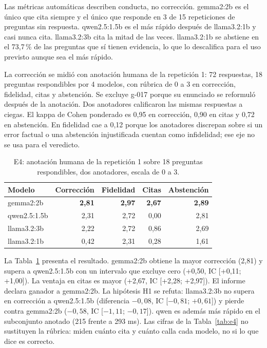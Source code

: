 \documentclass[11pt]{tg_usta}
\begin{document}
Las métricas automáticas describen conducta, no corrección. gemma2:2b es el único que cita siempre y el único que responde en 3 de 15 repeticiones de preguntas sin respuesta. qwen2.5:1.5b es el más rápido después de llama3.2:1b y casi nunca cita. llama3.2:3b cita la mitad de las veces. llama3.2:1b se abstiene en el 73,7\,\% de las preguntas que sí tienen evidencia, lo que lo descalifica para el uso previsto aunque sea el más rápido.

La corrección se midió con anotación humana de la repetición 1: 72 respuestas, 18 preguntas respondibles por 4 modelos, con rúbrica de 0 a 3 en corrección, fidelidad, citas y abstención. Se excluye g-017 porque su enunciado se reformuló después de la anotación. Dos anotadores calificaron las mismas respuestas a ciegas. El kappa de Cohen ponderado es 0,95 en corrección, 0,90 en citas y 0,72 en abstención. En fidelidad cae a 0,12 porque los anotadores discrepan sobre si un error factual o una abstención injustificada cuentan como infidelidad; ese eje no se usa para el veredicto.

\begin{table}[htbp]
\centering
\footnotesize
\begin{tabular}{@{}lrrrr@{}}
\toprule
Modelo & Corrección & Fidelidad & Citas & Abstención \\
\midrule
gemma2:2b & \textbf{2,81} & \textbf{2,97} & \textbf{2,67} & \textbf{2,89} \\
qwen2.5:1.5b & 2,31 & 2,72 & 0,00 & 2,81 \\
llama3.2:3b & 2,22 & 2,72 & 0,86 & 2,69 \\
llama3.2:1b & 0,42 & 2,31 & 0,28 & 1,61 \\
\bottomrule
\end{tabular}
\caption{E4: anotación humana de la repetición 1 sobre 18 preguntas respondibles, dos anotadores, escala de 0 a 3.}
\label{tab:e4humana}
\end{table}

La Tabla~\ref{tab:e4humana} presenta el resultado. gemma2:2b obtiene la mayor corrección (2,81) y supera a qwen2.5:1.5b con un intervalo que excluye cero (+0,50, IC [+0,11; +1,00]). La ventaja en citas es mayor (+2,67, IC [+2,28; +2,97]). El informe declara ganador a gemma2:2b. La hipótesis H1 se refuta: llama3.2:3b no supera en corrección a qwen2.5:1.5b (diferencia $-0,08$, IC [$-0,81$; $+0,61$]) y pierde contra gemma2:2b ($-0,58$, IC [$-1,11$; $-0,17$]). qwen es además más rápido en el subconjunto anotado (215 frente a 293 ms). Las cifras de la Tabla~\ref{tab:e4} no sustituyen la rúbrica: miden cuánto cita y cuánto calla cada modelo, no si lo que dice es correcto.
\end{document}
